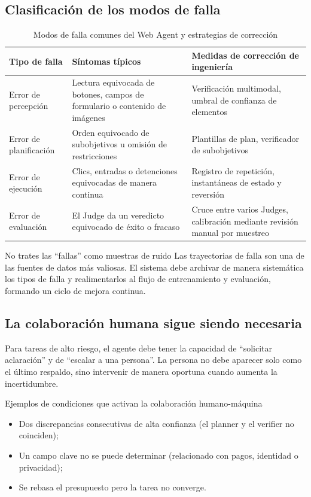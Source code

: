 \documentclass[a4paper]{article}
\begin{document}
\subsection{Clasificación de los modos de falla}
\begin{table}[H]
\centering
\small
\begin{tabular}{p{2.7cm}p{3.8cm}p{4.2cm}}
\toprule
\textbf{Tipo de falla} & \textbf{Síntomas típicos} & \textbf{Medidas de corrección de ingeniería} \\
\midrule
Error de percepción & Lectura equivocada de botones, campos de formulario o contenido de imágenes & Verificación multimodal, umbral de confianza de elementos \\
Error de planificación & Orden equivocado de subobjetivos u omisión de restricciones & Plantillas de plan, verificador de subobjetivos \\
Error de ejecución & Clics, entradas o detenciones equivocadas de manera continua & Registro de repetición, instantáneas de estado y reversión \\
Error de evaluación & El Judge da un veredicto equivocado de éxito o fracaso & Cruce entre varios Judges, calibración mediante revisión manual por muestreo \\
\bottomrule
\end{tabular}
\caption{Modos de falla comunes del Web Agent y estrategias de corrección}
\end{table}

\begin{warningbox}{No trates las ``fallas'' como muestras de ruido}
Las trayectorias de falla son una de las fuentes de datos más valiosas. El sistema debe archivar de manera sistemática los tipos de falla y realimentarlos al flujo de entrenamiento y evaluación, formando un ciclo de mejora continua.
\end{warningbox}

\subsection{La colaboración humana sigue siendo necesaria}
Para tareas de alto riesgo, el agente debe tener la capacidad de ``solicitar aclaración'' y de ``escalar a una persona''. La persona no debe aparecer solo como el último respaldo, sino intervenir de manera oportuna cuando aumenta la incertidumbre.

\begin{knowledgebox}{Ejemplos de condiciones que activan la colaboración humano-máquina}
\begin{itemize}
    \item Dos discrepancias consecutivas de alta confianza (el planner y el verifier no coinciden);
    \item Un campo clave no se puede determinar (relacionado con pagos, identidad o privacidad);
    \item Se rebasa el presupuesto pero la tarea no converge.
\end{itemize}
\end{knowledgebox}
\end{document}
